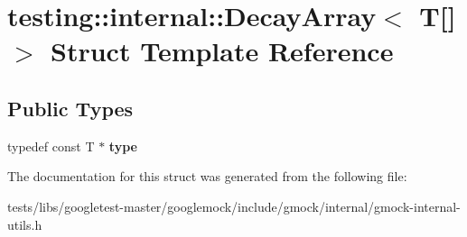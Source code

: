 \hypertarget{structtesting_1_1internal_1_1DecayArray_3_01T[]_4}{}\section{testing\+:\+:internal\+:\+:Decay\+Array$<$ T\mbox{[}\mbox{]}$>$ Struct Template Reference}
\label{structtesting_1_1internal_1_1DecayArray_3_01T[]_4}
\subsection*{Public Types}
\begin{DoxyCompactItemize}
\item 
\mbox{\label{structtesting_1_1internal_1_1DecayArray_3_01T[]_4_a1820b673d104b3a985faaef8db5d77d2}} 
typedef const T $\ast$ {\bfseries type}
\end{DoxyCompactItemize}


The documentation for this struct was generated from the following file\+:\begin{DoxyCompactItemize}
\item 
tests/libs/googletest-\/master/googlemock/include/gmock/internal/gmock-\/internal-\/utils.\+h\end{DoxyCompactItemize}
